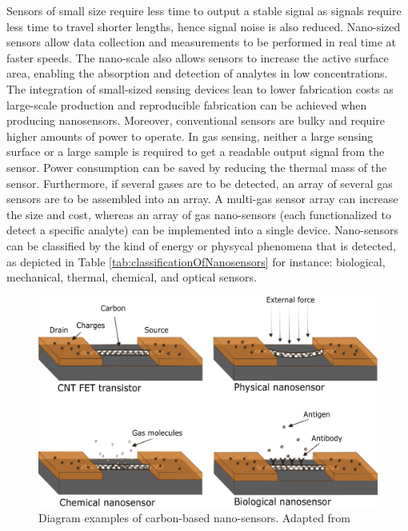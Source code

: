 Sensors of small size require less time to output a stable signal as signals require less time to travel shorter lengths, hence signal noise is also reduced. Nano-sized sensors allow data collection and measurements to be performed in real time at faster speeds. \cite{Khanna2016} The nano-scale also allows sensors to increase the active surface area, enabling the absorption and detection of analytes in low concentrations. \cite{Khanna2016} The integration of small-sized sensing devices lean to lower fabrication costs as large-scale production and reproducible fabrication can be achieved when producing nanosensors. \cite{Khanna2016} Moreover, conventional sensors are bulky and require higher amounts of power to operate. In gas sensing, neither a large sensing surface or a large sample is required to get a readable output signal from the sensor. Power consumption can be saved by reducing the thermal mass of the sensor. \cite{Khanna2016} Furthermore, if several gases are to be detected, an array of several gas sensors are to be assembled into an array. A multi-gas sensor array can increase the size and cost, whereas an array of gas nano-sensors (each functionalized to detect a specific analyte) can be implemented into a single device. \cite{Khanna2016} Nano-sensors can be classified by the kind of energy or physycal phenomena that is detected, as depicted in Table \ref{tab:classificationOfNanosensors} for instance: biological, mechanical, thermal, chemical, and optical sensors. \cite{Khanna2016, BaudritJ2017}

\begin{figure}[th]
\centering
\includegraphics[scale=0.50]{./Figures/typesOfNanoSensors.png}
\decoRule
\caption[Types of Nano-sensors]{Diagram examples of carbon-based nano-sensors. Adapted from \cite{BaudritJ2017}}
\label{fig:diameterComparisonOfCarbonFibers}
\end{figure}

